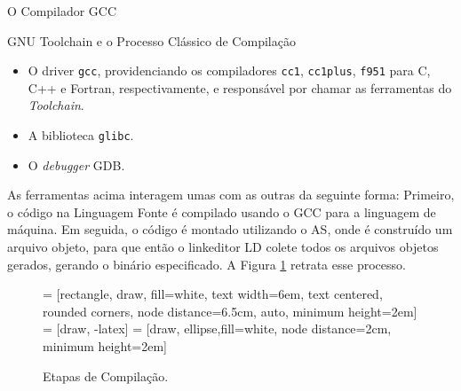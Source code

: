 \begin{section}{O Compilador GCC}
\begin{subsection}{GNU Toolchain e o Processo Clássico de Compilação}
\begin{itemize}
    \item O driver \texttt{gcc}, providenciando os compiladores \texttt{cc1},
        \texttt{cc1plus}, \texttt{f951} para C, C++ e Fortran, respectivamente,
        e responsável por chamar as ferramentas do \textit{Toolchain}.

    \item A biblioteca \texttt{glibc}.

    \item O \textit{debugger} GDB.
\end{itemize}

As ferramentas acima interagem umas com as outras da seguinte forma: Primeiro, o código na
Linguagem Fonte é compilado usando o GCC para a linguagem de máquina. Em seguida, o código
é montado utilizando o AS, onde é construído um arquivo objeto, para que então o linkeditor
LD colete todos os arquivos objetos gerados, gerando o binário especificado. A Figura
\ref{fig:gnu_toolchain} retrata esse processo.


\begin{figure}
 = [rectangle, draw, fill=white,
    text width=6em, text centered, rounded corners, node distance=6.5cm, auto, minimum height=2em]
 = [draw, -latex]
 = [draw, ellipse,fill=white, node distance=2cm,
    minimum height=2em]
\begin{center}
\end{center}
\caption{Etapas de Compilação.}
\label{fig:gnu_toolchain}
\end{figure}


\end{subsection}
\end{section}
